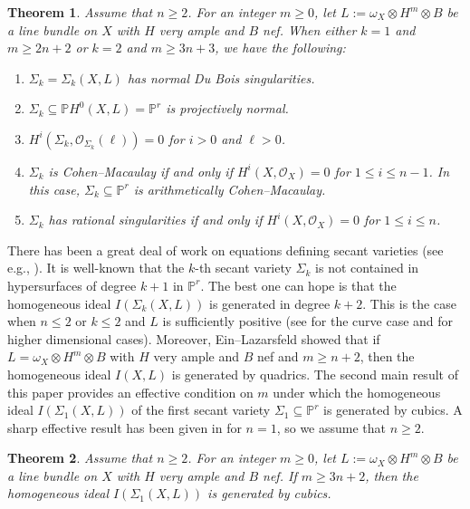\documentclass{amsart}
\theoremstyle{plain}
\newtheorem{thm}{Theorem}[section]
\theoremstyle{definition}
\theoremstyle{remark}
\begin{document}
\begin{thm}\label{thm:main1}
Assume that $n \geq 2$. For an integer $m \geq 0$, let $L := \omega_X \otimes H^m \otimes B$ be a line bundle on $X$ with $H$ very ample and $B$ nef. When either $k=1$ and $m \geq 2n+2$ or $k=2$ and $m \geq 3n+3$, we have the following:
\begin{enumerate}
   \item $\Sigma_k=\Sigma_k(X, L)$ has normal Du Bois singularities.
   \item $\Sigma_k \subseteq \mathbb{P} H^0(X, L) = \mathbb{P}^r$ is projectively normal.
   \item $H^i(\Sigma_k, \mathcal{O}_{\Sigma_k}(\ell))=0$ for $i > 0$ and $\ell > 0$. 
   \item $\Sigma_k$ is Cohen--Macaulay if and only if $H^i(X, \mathcal{O}_X)=0$ for $1 \leq i \leq n-1$. In this case, $\Sigma_k \subseteq \mathbb{P}^r$ is arithmetically Cohen--Macaulay.
   \item $\Sigma_k$ has rational singularities if and only if $H^i(X, \mathcal{O}_X)=0$ for $1 \leq i \leq n$. 
\end{enumerate}
\end{thm}

There has been a great deal of work on equations defining secant varieties (see e.g., \cite{Agostini.Park.25, BBF24, BGL13, Choi.Lacini.Park.Sheridan.25, Ein.Niu.Park.20, Raicu, SV2011}). It is well-known that the $k$-th secant variety $\Sigma_k$ is not contained in hypersurfaces of degree $k+1$ in $\mathbb{P}^r$. The best one can hope is that the homogeneous ideal $I(\Sigma_k(X, L))$ is generated in degree $k+2$. This is the case when $n \leq 2$ or $k\leq 2$ and $L$ is sufficiently positive (see \cite[Theorem 1.2]{Ein.Niu.Park.20} for the curve case and \cite[Theorem B]{Choi.Lacini.Park.Sheridan.25} for higher dimensional cases). Moreover, Ein--Lazarsfeld \cite[Theorem 1]{Ein.Lazarsfeld.93} showed that if $L = \omega_X \otimes H^m \otimes B$ with $H$ very ample and $B$ nef and $m \geq n+2$, then the homogeneous ideal $I(X, L)$ is generated by quadrics. The second main result of this paper provides an effective condition on $m$ under which the homogeneous ideal $I(\Sigma_1(X, L))$ of the first secant variety $\Sigma_1 \subseteq \mathbb{P}^r$ is generated by cubics. A sharp effective result has been given in \cite{Ein.Niu.Park.20} for $n=1$, so we assume that $n \geq 2$. 

\begin{thm}\label{thm:main2}
Assume that $n \geq 2$. For an integer $m \geq 0$, let $L:=\omega_X \otimes H^m \otimes B$ be a line bundle on $X$ with $H$ very ample and $B$ nef. If $m \geq 3n+2$, then the homogeneous ideal $I(\Sigma_1(X, L))$ is generated by cubics.
\end{thm}
\end{document}
